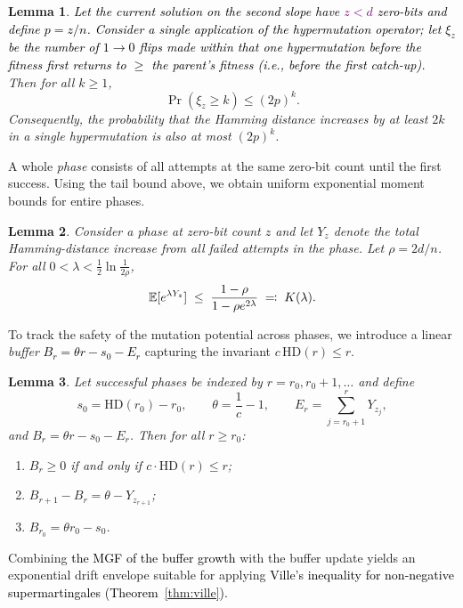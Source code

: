 \documentclass[lettersize,journal]{IEEEtran}
\newcommand{\new}[1]{\textcolor{black}{#1}}
\newcommand{\rev}[1]{\textcolor{black}{#1}}
\newcommand{\rerev}[1]{\textcolor{purple}{#1}}
\newcommand{\EE}{\mathbb{E}}
\newtheorem{lemma}{Lemma}
\begin{document}
{\begin{lemma}\label{lem:xi-tail}
	\textcolor{black}{Let the current solution on the second slope have \rerev{$z< d$} zero-bits and
	define $p=z/n$.
	Consider a single application of the hypermutation operator; let $\xi_z$ be
	the number of $1\to0$ flips made \emph{within that one hypermutation} before
	the fitness first returns to $\ge$ the parent's fitness (i.e., before the
	first catch-up).}
	Then for all $k\ge1$,
	\[
	\Pr(\xi_z\ge k)\le (2p)^k.
	\]
	Consequently, the probability that the Hamming distance increases by at least 
	$2k$ in a single hypermutation is also at most $(2p)^k$.
\end{lemma}



A whole \emph{phase} consists of all attempts at the same zero-bit count until the 
first success.  
Using the tail bound above, we obtain uniform exponential moment bounds for 
entire phases.

\begin{lemma}\label{lem:phase-mgf}
	Consider a phase at zero-bit count $z$ and let $Y_z$ denote the total 
	Hamming-distance increase from all failed attempts in the phase.  
	Let $\rho = 2d/n$.  
	For all $0<\lambda<\tfrac12\ln\frac{1}{2\rho}$,
	\[
	\EE[e^{\lambda Y_z}] 
	\;\le\; 
	\textcolor{black}{\frac{1-\rho}{1-\rho e^{2\lambda}}
	\;\eqqcolon\; K(\lambda).}
	\]
\end{lemma}



To track the safety of the mutation potential across phases, we introduce a 
linear \emph{buffer} \new{$B_r = \theta r - s_0 - E_r$} capturing the invariant $c\,\mathrm{HD}(r)\le r$.

\begin{lemma}\label{lem:buffer}
	Let successful phases be indexed by $r=r_0,r_0+1,\dots$ and define
	\[
	s_0=\mathrm{HD}(r_0)-r_0, \qquad 
	\theta=\frac{1}{c}-1, \qquad
	E_r=\sum_{j=r_0+1}^{r} Y_{z_j},
	\]
	and $B_r = \theta r - s_0 - E_r$.
	Then for all $r\ge r_0$:
	\begin{enumerate}
		\item 
		$B_r\ge0$ if and only if $c\cdot\mathrm{HD}(r)\le r$;
		\item 
		$B_{r+1}-B_r=\theta-Y_{z_{r+1}}$;
		\item 
		$B_{r_0}=\theta r_0 - s_0$.
	\end{enumerate}
\end{lemma}


Combining \rev{the MGF of the buffer growth} with the buffer update yields an exponential drift 
envelope suitable for applying \textcolor{black}{Ville's inequality for non-negative supermartingales (Theorem~\ref{thm:ville}).}

}
\end{document}
